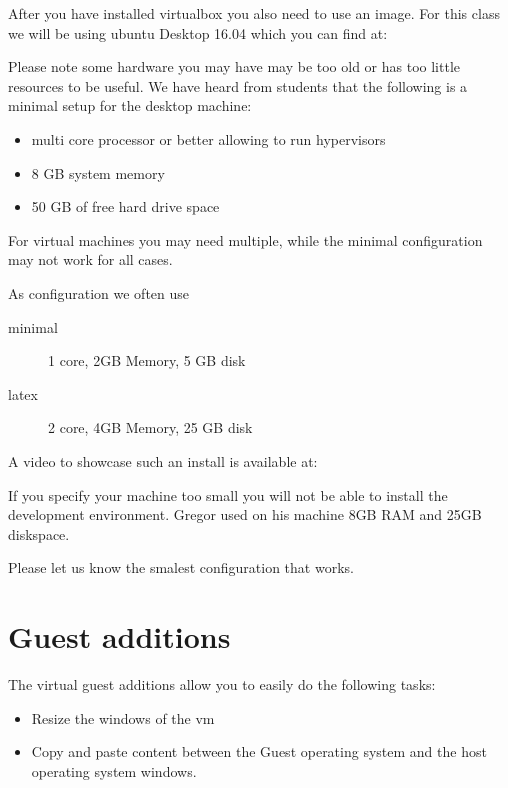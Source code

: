 After you have installed virtualbox you also need to use an image. For
this class we will be using ubuntu Desktop 16.04 which you can find at:



Please note some hardware you may have may be too old or has too
little resources to be useful. We have heard from students that the
following is a minimal setup for the desktop machine:

\begin{itemize}
\item  multi core processor or better allowing to run hypervisors
\item  8 GB system memory
\item  50 GB of free hard drive space
\end{itemize}

For virtual machines you may need multiple, while the minimal
configuration may not work for all cases.

As configuration we often use

\begin{description}
\item[minimal] 1 core, 2GB Memory, 5 GB disk 
\item[latex] 2 core, 4GB Memory, 25 GB disk 
\end{description}

A video to showcase such an install is available at:


\begin{NOTE}
  If you specify your machine too small you will not be able to
  install the development environment. Gregor used on his machine 8GB
  RAM and 25GB diskspace.
\end{NOTE}

Please let us know the smalest configuration that works.

\section{Guest additions}\label{guest-additions}

The virtual guest additions allow you to easily do the following tasks:

\begin{itemize}
\item  Resize the windows of the vm
\item  Copy and paste content between the Guest operating system and
  the host operating system windows.
\end{itemize}

